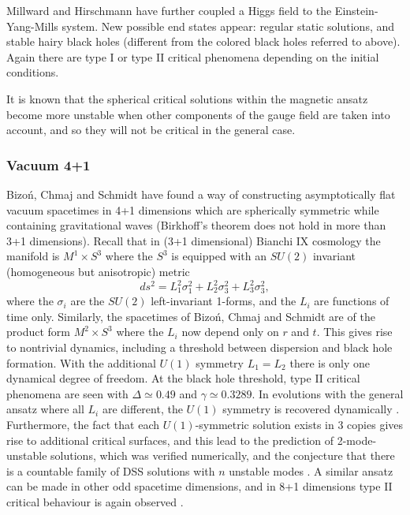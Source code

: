 \documentclass{article}
\begin{document}
Millward and Hirschmann \cite{Millward} have further coupled a Higgs
field to the Einstein-Yang-Mills system. New possible end states
appear: regular static solutions, and stable hairy
black holes (different from the colored black holes referred to above).
Again there are type I or type II critical phenomena depending on the
initial conditions.

It is known that the spherical critical solutions within the magnetic
ansatz become more unstable when other components of the gauge field
are taken into account, and so they will not be critical in the general
case.


\subsubsection{Vacuum 4+1}

Bizo\'n, Chmaj and Schmidt \cite{BizonChmajSchmidt} have found a way
of constructing asymptotically flat vacuum spacetimes in 4+1
dimensions which are spherically symmetric while containing
gravitational waves (Birkhoff's theorem does not hold in more than 3+1
dimensions).  Recall that in (3+1 dimensional) Bianchi IX cosmology the
manifold is $M^1\times S^3$ where the $S^3$ is equipped with an
$SU(2)$ invariant (homogeneous but anisotropic) metric
\begin{equation}
ds^2 = L_1^2 \sigma_1^2 + L_2^2 \sigma_3^2 + L_3^2 \sigma_3^2,
\end{equation}
where the $\sigma_i$ are the $SU(2)$ left-invariant 1-forms, and the
$L_i$ are functions of time only. Similarly, the spacetimes of
Bizo\'n, Chmaj and Schmidt are of the product form $M^2\times S^3$
where the $L_i$ now depend only on $r$ and $t$. This gives rise to
nontrivial
dynamics, including a threshold between dispersion and black hole
formation. With the additional $U(1)$ symmetry $L_1=L_2$ there is only
one dynamical degree of freedom. At the black hole threshold, type II
critical phenomena are seen with $\Delta\simeq 0.49$ and $\gamma\simeq
0.3289$. In evolutions with the general ansatz where all $L_i$ are
different, the $U(1)$ symmetry is recovered dynamically
\cite{BizonChmajSchmidt2}. Furthermore, the fact that each
$U(1)$-symmetric solution exists in 3 copies gives rise to additional
critical surfaces, and this lead to the prediction of 2-mode-unstable
solutions, which was verified numerically, and the conjecture that
there is a countable family of DSS solutions with $n$ unstable modes
\cite{BizonChmajSchmidt2}. A similar ansatz can be made in other odd
spacetime dimensions, and in 8+1 dimensions type II critical behaviour
is again observed \cite{Bizonetal2005}.
\end{document}
